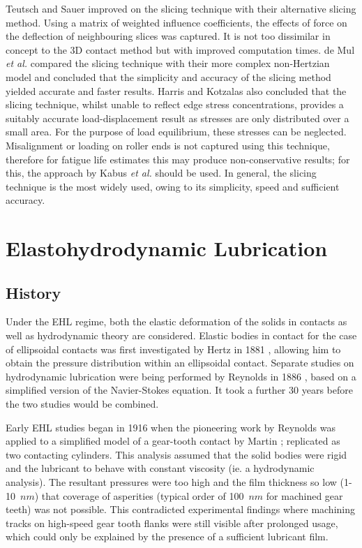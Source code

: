 Teutsch and Sauer \cite{Teutsch2004} improved on the slicing technique with their alternative slicing method. Using a matrix of weighted influence coefficients, the effects of force on the deflection of neighbouring slices was captured. It is not too dissimilar in concept to the 3D contact method but with improved computation times. de Mul \textit{et al.} \cite{DeMul1989_2} compared the slicing technique with their more complex non-Hertzian model and concluded that the simplicity and accuracy of the slicing method yielded accurate and faster results. Harris and Kotzalas \cite{Harris2007} also concluded that the slicing technique, whilst unable to reflect edge stress concentrations, provides a suitably accurate load-displacement result as stresses are only distributed over a small area. For the purpose of load equilibrium, these stresses can be neglected. Misalignment or loading on roller ends is not captured using this technique, therefore for fatigue life estimates this may produce non-conservative results; for this, the approach by Kabus \textit{et al.} should be used. In general, the slicing technique is the most widely used, owing to its simplicity, speed and sufficient accuracy.

\section{Elastohydrodynamic Lubrication}

\subsection{History}

Under the EHL regime, both the elastic deformation of the solids in contacts as well as hydrodynamic theory are considered. Elastic bodies in contact for the case of ellipsoidal contacts was first investigated by Hertz in 1881 \cite{Hertz1881}, allowing him to obtain the pressure distribution within an ellipsoidal contact. Separate studies on hydrodynamic lubrication were being performed by Reynolds in 1886 \cite{Reynolds1886}, based on a simplified version of the Navier-Stokes equation. It took a further 30 years before the two studies would be combined.

Early EHL studies began in 1916 when the pioneering work by Reynolds was applied to a simplified model of a gear-tooth contact by Martin \cite{Martin1916}; replicated as two contacting cylinders. This analysis assumed that the solid bodies were rigid and the lubricant to behave with constant viscosity (ie. a hydrodynamic analysis). The resultant pressures were too high and the film thickness so low (1-10~$nm$) that coverage of asperities (typical order of 100~$nm$ for machined gear teeth) was not possible. This contradicted experimental findings where machining tracks on high-speed gear tooth flanks were still visible after prolonged usage, which could only be explained by the presence of a sufficient lubricant film.

